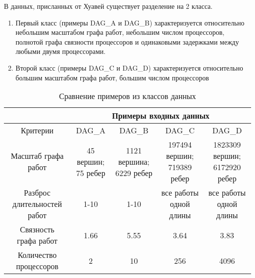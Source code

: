 В данных, присланных от Хуавей существует разделение на 2 класса.
\begin{enumerate}
    \item Первый класс (примеры DAG\_A и DAG\_B) характеризуется относительно небольшим масштабом графа работ, небольшим числом процессоров, полнотой графа связности процессоров и одинаковыми задержками между любыми двумя процессорами.
    \item Второй класс (примеры DAG\_C и DAG\_D) характеризуется относительно большим масштабом графа работ, большим числом процессоров
\end{enumerate}
\begin{table}[!htbp]
    \caption{Сравнение примеров из классов данных}

    \begin{tabular}{c|c|c|c|c}
                            & \multicolumn{4}{c}{Примеры входных данных}                            \\
        \hline
        Критерии            & DAG\_A                                     & DAG\_B & DAG\_C & DAG\_D \\
        \hline
        Масштаб графа работ & \makecell{45 вершин;                                                  \\75 ребер}                        & \makecell{1121 вершина;\\6229 ребер} & \makecell{197494 вершин;\\719389 ребер} & \makecell{1823309 вершин;\\6172920 ребер} \\
        \hline
        \makecell{Разброс                                                                           \\длительностей работ}            & 1-10                                       & 1-10   & \makecell{все работы\\одной длины} & \makecell{все работы\\одной длины} \\
        \hline
        \makecell{Связность                                                                         \\графа работ}                  & 1.66                                       & 5.55   & 3.64                   & 3.83                   \\
        \hline
        \makecell{Количество                                                                        \\процессоров}                 & 2                                          & 10     & 256                    & 4096                   \\

\end{tabular}
\end{table}

